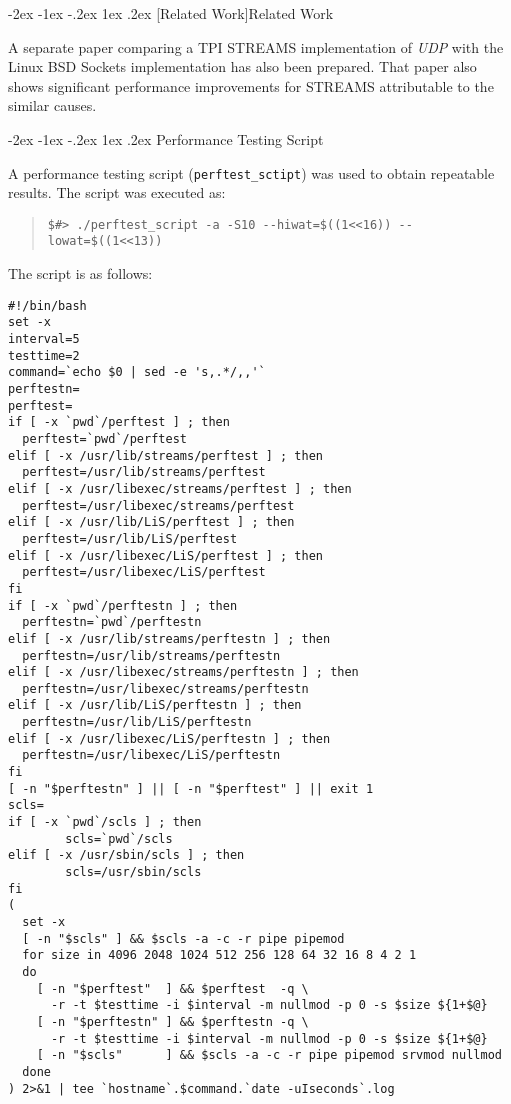 \documentclass[letterpaper,final,notitlepage,twocolumn,10pt,twoside]{article}
\makeatletter
\let\large = \normalsize
\let\normalsize = \small
\let\small = \footnotesize
\let\footnotesize = \scriptsize
\let\scriptsize = \tiny
\renewcommand\section{\@startsection {section}{1}{\z@}%
                                   {-2ex \@plus -1ex \@minus -.2ex}%
                                   {1ex \@plus .2ex}%
                                   {\normalfont\large\bfseries}}
\makeatother
\begin{document}
\section[Related Work]{Related Work}

A separate paper comparing a TPI STREAMS implementation of \textsl{UDP} with the Linux BSD Sockets
implementation has also been prepared.  That paper also shows significant performance improvements
for STREAMS attributable to the similar causes.

\FloatBarrier
{}


\clearpage
\begin{appendix}

\section{Performance Testing Script}
\label{section:script}

A performance testing script (\texttt{perftest\_sctipt}) was used to obtain repeatable results.  The
script was executed as:

\begin{quote}
\scriptsize
\begin{verbatim}
$#> ./perftest_script -a -S10 --hiwat=$((1<<16)) --lowat=$((1<<13))
\end{verbatim}
\normalsize
\end{quote}

The script is as follows:

\scriptsize
\begin{verbatim}
#!/bin/bash
set -x
interval=5
testtime=2
command=`echo $0 | sed -e 's,.*/,,'`
perftestn=
perftest=
if [ -x `pwd`/perftest ] ; then
  perftest=`pwd`/perftest
elif [ -x /usr/lib/streams/perftest ] ; then
  perftest=/usr/lib/streams/perftest
elif [ -x /usr/libexec/streams/perftest ] ; then
  perftest=/usr/libexec/streams/perftest
elif [ -x /usr/lib/LiS/perftest ] ; then
  perftest=/usr/lib/LiS/perftest
elif [ -x /usr/libexec/LiS/perftest ] ; then
  perftest=/usr/libexec/LiS/perftest
fi
if [ -x `pwd`/perftestn ] ; then
  perftestn=`pwd`/perftestn
elif [ -x /usr/lib/streams/perftestn ] ; then
  perftestn=/usr/lib/streams/perftestn
elif [ -x /usr/libexec/streams/perftestn ] ; then
  perftestn=/usr/libexec/streams/perftestn
elif [ -x /usr/lib/LiS/perftestn ] ; then
  perftestn=/usr/lib/LiS/perftestn
elif [ -x /usr/libexec/LiS/perftestn ] ; then
  perftestn=/usr/libexec/LiS/perftestn
fi
[ -n "$perftestn" ] || [ -n "$perftest" ] || exit 1
scls=
if [ -x `pwd`/scls ] ; then
        scls=`pwd`/scls
elif [ -x /usr/sbin/scls ] ; then
        scls=/usr/sbin/scls
fi
(
  set -x
  [ -n "$scls" ] && $scls -a -c -r pipe pipemod
  for size in 4096 2048 1024 512 256 128 64 32 16 8 4 2 1
  do
    [ -n "$perftest"  ] && $perftest  -q \
      -r -t $testtime -i $interval -m nullmod -p 0 -s $size ${1+$@}
    [ -n "$perftestn" ] && $perftestn -q \
      -r -t $testtime -i $interval -m nullmod -p 0 -s $size ${1+$@}
    [ -n "$scls"      ] && $scls -a -c -r pipe pipemod srvmod nullmod
  done
) 2>&1 | tee `hostname`.$command.`date -uIseconds`.log
\end{verbatim}
\normalsize



\end{appendix}
\end{document}
